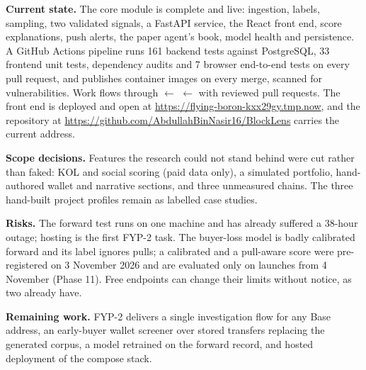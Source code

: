 \textbf{Current state.} The core module is complete and live: ingestion, labels, sampling, two validated signals, a FastAPI service, the React front end, score explanations, push alerts, the paper agent's book, model health and persistence. A GitHub Actions pipeline runs 161 backend tests against PostgreSQL, 33 frontend unit tests, dependency audits and 7 browser end-to-end tests on every pull request, and publishes container images on every merge, scanned for vulnerabilities. Work flows through  $\leftarrow$  $\leftarrow$  with reviewed pull requests. The front end is deployed and open at \url{https://flying-boron-kxx29gy.tmp.now}, and the repository at \url{https://github.com/AbdullahBinNasir16/BlockLens} carries the current address.

\textbf{Scope decisions.} Features the research could not stand behind were cut rather than faked: KOL and social scoring (paid data only), a simulated portfolio, hand-authored wallet and narrative sections, and three unmeasured chains. The three hand-built project profiles remain as labelled case studies.

\textbf{Risks.} The forward test runs on one machine and has already suffered a 38-hour outage; hosting is the first FYP-2 task. The buyer-loss model is badly calibrated forward and its label ignores pulls; a calibrated and a pull-aware score were pre-registered on 3 November 2026 and are evaluated only on launches from 4 November (Phase 11). Free endpoints can change their limits without notice, as two already have.

\textbf{Remaining work.} FYP-2 delivers a single investigation flow for any Base address, an early-buyer wallet screener over stored transfers replacing the generated corpus, a model retrained on the forward record, and hosted deployment of the compose stack.
